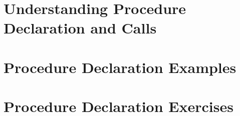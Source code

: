 
\clearpage
\def\pageLang{none}
\section{Understanding Procedure Declaration and Calls} %
\label{sec:understanding_procedure_declaration_and_calls}




\clearpage
\section{Procedure Declaration Examples} %
\label{sec:procedure_declaration_examples}




\clearpage
\section{Procedure Declaration Exercises} %
\label{sec:procedure_declaration_exercises}








